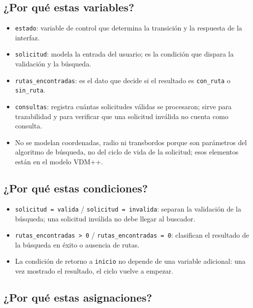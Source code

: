 \documentclass[11pt,a4paper]{article}
\begin{document}
\subsection{¿Por qué estas variables?}

\begin{itemize}
  \item \texttt{estado}: variable de control que determina la transición y la respuesta de la interfaz.
  \item \texttt{solicitud}: modela la entrada del usuario; es la condición que dispara la validación y la búsqueda.
  \item \texttt{rutas\_encontradas}: es el dato que decide si el resultado es \texttt{con\_ruta} o \texttt{sin\_ruta}.
  \item \texttt{consultas}: registra cuántas solicitudes válidas se procesaron; sirve para trazabilidad y para verificar que una solicitud inválida no cuenta como consulta.
  \item No se modelan coordenadas, radio ni transbordos porque son parámetros del algoritmo de búsqueda, no del ciclo de vida de la solicitud; esos elementos están en el modelo VDM++.
\end{itemize}

\subsection{¿Por qué estas condiciones?}

\begin{itemize}
  \item \texttt{solicitud = valida} / \texttt{solicitud = invalida}: separan la validación de la búsqueda; una solicitud inválida no debe llegar al buscador.
  \item \texttt{rutas\_encontradas > 0} / \texttt{rutas\_encontradas = 0}: clasifican el resultado de la búsqueda en éxito o ausencia de rutas.
  \item La condición de retorno a \texttt{inicio} no depende de una variable adicional: una vez mostrado el resultado, el ciclo vuelve a empezar.
\end{itemize}

\subsection{¿Por qué estas asignaciones?}
\end{document}
